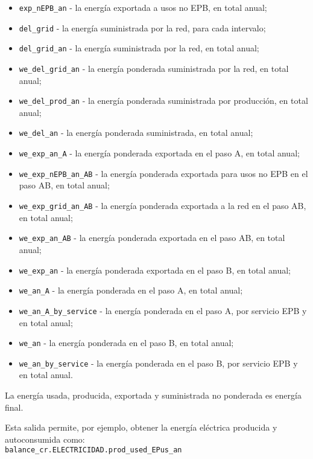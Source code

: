 \documentclass[10pt,notitlepage,oneside,a4paper]{article}
\begin{document}
\begin{itemize}
\item \texttt{exp\_nEPB\_an} - la energía exportada a usos no EPB, en total anual;
\item \texttt{del\_grid} - la energía suministrada por la red, para cada intervalo;
\item \texttt{del\_grid\_an} - la energía suministrada por la red, en total anual;
\item \texttt{we\_del\_grid\_an} - la energía ponderada suministrada por la red, en total anual;
\item \texttt{we\_del\_prod\_an} - la energía ponderada suministrada por producción, en total anual;
\item \texttt{we\_del\_an} - la energía ponderada suministrada, en total anual;
\item \texttt{we\_exp\_an\_A} - la energía ponderada exportada en el paso A, en total anual;
\item \texttt{we\_exp\_nEPB\_an\_AB} - la energía ponderada exportada para usos no EPB en el paso AB, en total anual;
\item \texttt{we\_exp\_grid\_an\_AB} - la energía ponderada exportada a la red en el paso AB, en total anual;
\item \texttt{we\_exp\_an\_AB} - la energía ponderada exportada en el paso AB, en total anual;
\item \texttt{we\_exp\_an} - la energía ponderada exportada en el paso B, en total anual;
\item \texttt{we\_an\_A} - la energía ponderada en el paso A, en total anual;
\item \texttt{we\_an\_A\_by\_service} - la energía ponderada en el paso A, por servicio EPB y en total anual;
\item \texttt{we\_an} - la energía ponderada en el paso B, en total anual;
\item \texttt{we\_an\_by\_service} - la energía ponderada en el paso B, por servicio EPB y en total anual.
\end{itemize}

\begin{myquote}\small
La energía usada, producida, exportada y suministrada no ponderada es energía final.
\end{myquote}

\begin{myquote}\small

Esta salida permite, por ejemplo, obtener la energía eléctrica producida y autoconsumida como:\\

\texttt{balance\_cr.ELECTRICIDAD.prod\_used\_EPus\_an}
\end{myquote}
\end{document}
